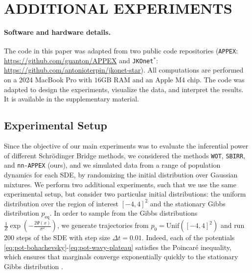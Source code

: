\documentclass[twoside]{article}
\newcommand{\jkonetstar}{\texttt{JKOnet}$^\ast$}
\newcommand{\nappex}{\texttt{nn-APPEX}}
\newcommand{\wot}{\texttt{WOT}}
\newcommand{\sbirr}{\texttt{SBIRR}}
\begin{document}
\section{ADDITIONAL EXPERIMENTS}
\label{sec: additional_experiments_appendix}

\paragraph{Software and hardware details.} The code in this paper was adapted from two public code repositories (\texttt{APPEX}: \url{https://github.com/guanton/APPEX} and \jkonetstar{}: \url{https://github.com/antonioterpin/jkonet-star}). All computations are performed on a 2024 MacBook Pro with $16$GB RAM and an Apple M4 chip. The code was adapted to design the experiments, visualize the data, and interpret the results. It is available in the supplementary material.

\subsection{Experimental Setup}
Since the objective of our main experiments was to evaluate the inferential power of different Schr\"odinger Bridge methods, we considered the methods \wot, \sbirr, and \nappex{} (ours), and we simulated data from a range of population dynamics for each SDE, by randomizing the initial distribution over Gaussian mixtures. We perform two additional experiments, such that we use the same experimental setup, but consider two particular initial distributions: the uniform distribution over the region of interest $[-4,4]^2$ and the stationary Gibbs distribution $p_{\mathrm{eq}}$. In order to sample from the Gibbs distributions $\frac{1}{Z}\exp(-\frac{2\Psi(x)}{\sigma^2})$, we generate trajectories from $p_0= \textrm{Unif}([-4,4]^2)$ and run $200$ steps of the SDE with step size $\Delta t=0.01$. Indeed, each of the potentials \eqref{eq:pot-bohachevsky}-\eqref{eq:pot-wavy-plateau} satisfies the Poincaré inequality, which ensures that marginals converge exponentially quickly to the stationary Gibbs distribution \citep[Theorem 4.4]{pavliotis2014stochastic}. 
\end{document}
